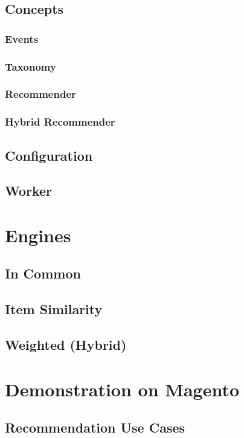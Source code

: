 \subsection{Concepts}

\subsubsection{Events}
\subsubsection{Taxonomy}
\subsubsection{Recommender}
\subsubsection{Hybrid Recommender}

\subsection{Configuration}

\subsection{Worker}

\section{Engines}

\subsection{In Common}

\subsection{Item Similarity}

\subsection{Weighted (Hybrid)}

\section{Demonstration on Magento}

\subsection{Recommendation Use Cases}